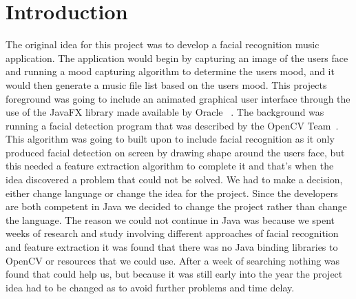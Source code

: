 \chapter{Introduction}
The original idea for this project was to develop a facial recognition music application. The application would begin by capturing an image of the users face and running a mood capturing algorithm to determine the users mood, and it would then generate a music file list based on the users mood. This projects foreground was going to include an animated graphical user interface through the use of the JavaFX library made available by Oracle ~\cite{javafx}. The background was running a facial detection program that was described by the OpenCV Team~\cite{opencv}. This algorithm was going to built upon to include facial recognition as it only produced facial detection on screen by drawing shape around the users face, but this needed a feature extraction algorithm to complete it and that's when the idea discovered a problem that could not be solved. We had to make a decision,  either change language or change the idea for the project. Since the developers are both competent in Java we decided to change the project rather than change the language. The reason we could not continue in Java was because we spent weeks of research and study involving different approaches of facial recognition and feature extraction it was found that there was no Java binding libraries to OpenCV or resources that we could use. After a week of searching nothing was found that could help us, but because it was still early into the year the project idea had to be changed as to avoid further problems and time delay.

